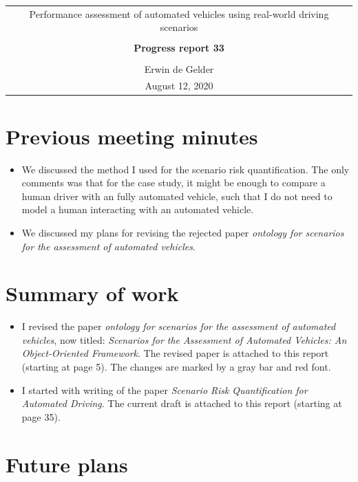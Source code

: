 \documentclass[10pt,final,a4paper,oneside,onecolumn]{article}
\newcommand{\progressreportnumber}{33}
\renewcommand{\author}{Erwin de Gelder}
\renewcommand{\date}{August 12, 2020}
\renewcommand{\title}{Performance assessment of automated vehicles using real-world driving scenarios}
\begin{document}
	
\begin{center}
	\begin{tabular}{c}
		\title \\ \\
		\textbf{\huge Progress report \progressreportnumber} \\ \\
		\author \\ 
		\date
	\end{tabular}
\end{center}

\section{Previous meeting minutes}

\begin{itemize}
	\item We discussed the method I used for the scenario risk quantification. The only comments was that for the case study, it might be enough to compare a human driver with an fully automated vehicle, such that I do not need to model a human interacting with an automated vehicle.
	\item We discussed my plans for revising the rejected paper \textit{ontology for scenarios for the assessment of automated vehicles}. 
\end{itemize}

\section{Summary of work}

\begin{itemize}
	\item I revised the paper \textit{ontology for scenarios for the assessment of automated vehicles}, now titled: \textit{Scenarios for the Assessment of Automated Vehicles: An Object-Oriented Framework}. The revised paper is attached to this report (starting at page 5). The changes are marked by a gray bar and red font.
	
	\item I started with writing of the paper \textit{Scenario Risk Quantification for Automated Driving}. The current draft is attached to this report (starting at page 35).
\end{itemize}

\section{Future plans}
\end{document}
